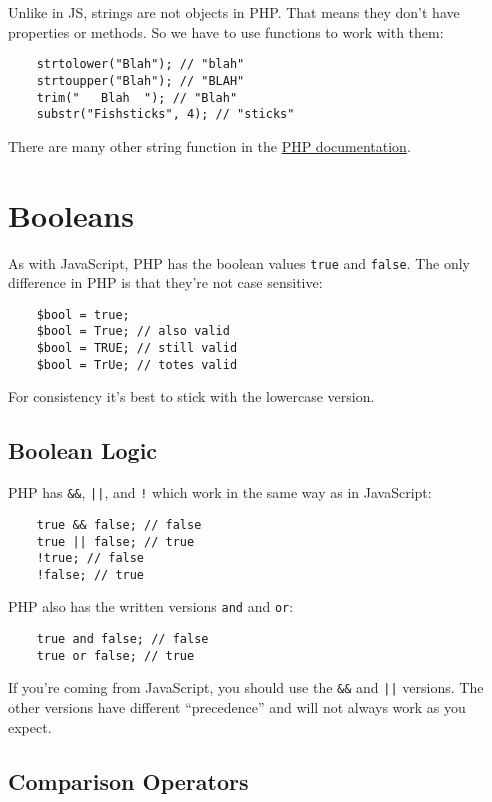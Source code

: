 Unlike in JS, strings are not objects in PHP. That means they don't have properties or methods. So we have to use functions to work with them:

\begin{verbatim}
    strtolower("Blah"); // "blah"
    strtoupper("Blah"); // "BLAH"
    trim("   Blah  "); // "Blah"
    substr("Fishsticks", 4); // "sticks"
\end{verbatim}

There are many other string function in the \href{http://www.php.net/manual/en/ref.strings.php}{PHP documentation}.


\section{Booleans}

As with JavaScript, PHP has the boolean values \texttt{true} and \texttt{false}. The only difference in PHP is that they're not case sensitive:

\begin{verbatim}
    $bool = true;
    $bool = True; // also valid
    $bool = TRUE; // still valid
    $bool = TrUe; // totes valid
\end{verbatim}

For consistency it's best to stick with the lowercase version.

\subsection{Boolean Logic}

PHP has \texttt{\&\&}, \texttt{||}, and \texttt{!} which work in the same way as in JavaScript:

\begin{verbatim}
    true && false; // false
    true || false; // true
    !true; // false
    !false; // true
\end{verbatim}

PHP also has the written versions \texttt{and} and \texttt{or}:

\begin{verbatim}
    true and false; // false
    true or false; // true
\end{verbatim}

If you're coming from JavaScript, you should use the \texttt{\&\&} and \texttt{||} versions. The other versions have different ``precedence'' and will not always work as you expect.

\subsection{Comparison Operators}

